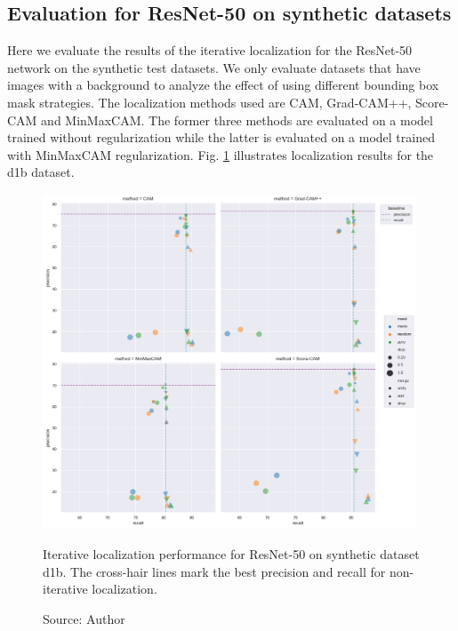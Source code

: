 \subsection{Evaluation for ResNet-50 on synthetic datasets}
Here we evaluate the results of the iterative localization for the ResNet-50 network on the synthetic test datasets. We only evaluate datasets that have images with a background to analyze the effect of using different bounding box mask strategies. The localization methods used are CAM, Grad-CAM++, Score-CAM and MinMaxCAM. The former three methods are evaluated on a model trained without regularization while the latter is evaluated on a model trained with MinMaxCAM regularization. Fig. \ref{fig:prec_iter_resnet50_syn_d1b} illustrates localization results for the d1b dataset.

\begin{figure}[h]
    \begin{center}       
    \includegraphics[width=0.99\textwidth]{images/fig_iter_resnet50_syn_d1b.png}
    \caption[Iterative localization performance for ResNet-50 on synthetic dataset d1b]{Iterative localization performance for ResNet-50 on synthetic dataset d1b. The cross-hair lines mark the best precision and recall for non-iterative localization.}
    \caption*{Source: Author}
    \label{fig:prec_iter_resnet50_syn_d1b}
    \end{center}
\end{figure}


